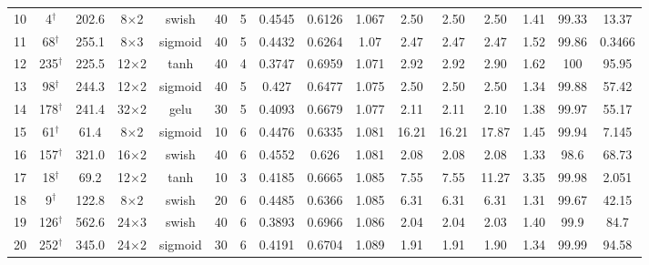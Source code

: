 \begin{tabular}{lcc cccc ccccccc cc}
  10 & 4$^\dagger$ & 202.6 & 8$\times$2 & swish & 40 & 5 & \num{0.4545} & \num{0.6126} & \num{1.067} & 2.50 & 2.50 & 2.50 & 1.41 & \num{99.33} & \num{13.37} \\
  11 & 68$^\dagger$ & 255.1 & 8$\times$3 & sigmoid & 40 & 5 & \num{0.4432} & \num{0.6264} & \num{1.07} & 2.47 & 2.47 & 2.47 & 1.52 & \num{99.86} & \num{0.3466} \\
  12 & 235$^\dagger$ & 225.5 & 12$\times$2 & tanh & 40 & 4 & \num{0.3747} & \num{0.6959} & \num{1.071} & 2.92 & 2.92 & 2.90 & 1.62 & \num{100} & \num{95.95} \\
  13 & 98$^\dagger$ & 244.3 & 12$\times$2 & sigmoid & 40 & 5 & \num{0.427} & \num{0.6477} & \num{1.075} & 2.50 & 2.50 & 2.50 & 1.34 & \num{99.88} & \num{57.42} \\
  14 & 178$^\dagger$ & 241.4 & 32$\times$2 & gelu & 30 & 5 & \num{0.4093} & \num{0.6679} & \num{1.077} & 2.11 & 2.11 & 2.10 & 1.38 & \num{99.97} & \num{55.17} \\
  15 & 61$^\dagger$ & 61.4 & 8$\times$2 & sigmoid & 10 & 6 & \num{0.4476} & \num{0.6335} & \num{1.081} & 16.21 & 16.21 & 17.87 & 1.45 & \num{99.94} & \num{7.145} \\
  16 & 157$^\dagger$ & 321.0 & 16$\times$2 & swish & 40 & 6 & \num{0.4552} & \num{0.626} & \num{1.081} & 2.08 & 2.08 & 2.08 & 1.33 & \num{98.6} & \num{68.73} \\
  17 & 18$^\dagger$ & 69.2 & 12$\times$2 & tanh & 10 & 3 & \num{0.4185} & \num{0.6665} & \num{1.085} & 7.55 & 7.55 & 11.27 & 3.35 & \num{99.98} & \num{2.051} \\
  18 & 9$^\dagger$ & 122.8 & 8$\times$2 & swish & 20 & 6 & \num{0.4485} & \num{0.6366} & \num{1.085} & 6.31 & 6.31 & 6.31 & 1.31 & \num{99.67} & \num{42.15} \\
  19 & 126$^\dagger$ & 562.6 & 24$\times$3 & swish & 40 & 6 & \num{0.3893} & \num{0.6966} & \num{1.086} & 2.04 & 2.04 & 2.03 & 1.40 & \num{99.9} & \num{84.7} \\
  20 & 252$^\dagger$ & 345.0 & 24$\times$2 & sigmoid & 30 & 6 & \num{0.4191} & \num{0.6704} & \num{1.089} & 1.91 & 1.91 & 1.90 & 1.34 & \num{99.99} & \num{94.58} \\
\bottomrule
\end{tabular}
